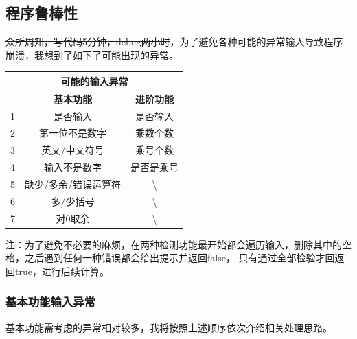 \documentclass[a4paper, 11pt, UTF8]{ctexart}
\begin{document}
\subsection{程序鲁棒性}

\sout{众所周知，写代码5分钟，debug两小时}，为了避免各种可能的异常输入导致程序崩溃，我想到了如下了可能出现的异常。

\begin{table}[H]
    \centering
    \begin{tabular}{|ccc|}
        \hline
        \multicolumn{3}{|c|}{\textbf{可能的输入异常}}                                           \\ \hline
        \multicolumn{1}{|c|}{}  & \multicolumn{1}{c|}{\textbf{基本功能}}    & \textbf{进阶功能} \\ \hline
        \multicolumn{1}{|c|}{1} & \multicolumn{1}{c|}{是否输入}             & 是否输入          \\ \hline
        \multicolumn{1}{|c|}{2} & \multicolumn{1}{c|}{第一位不是数字}       & 乘数个数          \\ \hline
        \multicolumn{1}{|c|}{3} & \multicolumn{1}{c|}{英文/中文符号}        & 乘号个数          \\ \hline
        \multicolumn{1}{|c|}{4} & \multicolumn{1}{c|}{输入不是数字}         & 是否是乘号        \\ \hline
        \multicolumn{1}{|c|}{5} & \multicolumn{1}{c|}{缺少/多余/错误运算符} & \textbackslash{}  \\ \hline
        \multicolumn{1}{|c|}{6} & \multicolumn{1}{c|}{多/少括号}            & \textbackslash{}  \\ \hline
        \multicolumn{1}{|c|}{7} & \multicolumn{1}{c|}{对0取余}              & \textbackslash{}  \\ \hline
    \end{tabular}
\end{table}

注：为了避免不必要的麻烦，在两种检测功能最开始都会遍历输入，删除其中的空格，之后遇到任何一种错误都会给出提示并返回false，
只有通过全部检验才回返回true，进行后续计算。

\subsubsection{基本功能输入异常}

基本功能需考虑的异常相对较多，我将按照上述顺序依次介绍相关处理思路。
\end{document}

